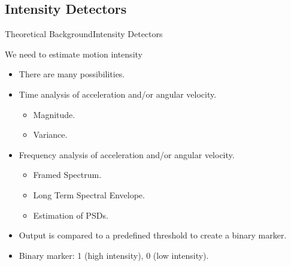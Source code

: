 \documentclass[10pt,aspectratio=1610]{beamer}
\begin{document}
\subsection{Intensity Detectors}
\label{subsec:intensity_detectors}
\begin{frame}{Theoretical Background}{Intensity Detectors}
\begin{block}{We need to estimate motion intensity}
\begin{itemize}
	\item There are many possibilities.
	\item Time analysis of acceleration and/or angular velocity.
	\begin{itemize}
		\item Magnitude. 
		\item Variance.
	\end{itemize}
	\item Frequency analysis of acceleration and/or angular velocity.
	\begin{itemize}
		\item Framed Spectrum.
		\item Long Term Spectral Envelope.
		\item Estimation of PSDs.
	\end{itemize}
	\item Output is compared to a predefined threshold to create a binary marker.
	\item Binary marker: 1 (high intensity), 0 (low intensity).
\end{itemize}
\end{block}
\end{frame}
\end{document}
